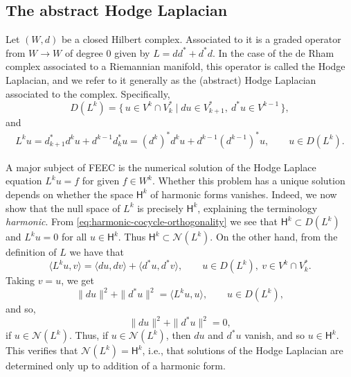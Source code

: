 \subsection{{The abstract Hodge Laplacian}}\label{sec:abstract-hodge-laplacian}

{Let $(W,d)$ be a closed Hilbert complex. Associated to it is a graded operator from $W\to W$ of degree $0$ given by $L=dd^*+d^*d$. In the case of the de Rham complex associated to a Riemannian manifold, this operator is called the Hodge Laplacian, and we refer to it generally as the (abstract) Hodge Laplacian associated to the complex. Specifically,}
\begin{equation}\label{eq:abstract-hodge-domain}
D(L^k)=\{\,u\in V^k\cap V_k^*\mid du\in V_{k+1}^*,\ d^*u\in V^{k-1}\,\},
\end{equation}
{and}
\begin{equation}\label{eq:abstract-hodge-operator}
\begin{gathered}
L^k u=d_{k+1}^*d^k u+d^{k-1}d_k^*u=(d^k)^*d^k u+d^{k-1}(d^{k-1})^*u,\qquad u\in D(L^k).
\end{gathered}
\end{equation}

{A major subject of FEEC is the numerical solution of the Hodge Laplace equation $L^k u=f$ for given $f\in W^k$. Whether this problem has a unique solution depends on whether the space $\mathsf H^k$ of harmonic forms vanishes. Indeed, we now show that the null space of $L^k$ is precisely $\mathsf H^k$, explaining the terminology \emph{harmonic}. From \eqref{eq:harmonic-cocycle-orthogonality} we see that $\mathsf H^k\subset D(L^k)$ and $L^k u=0$ for all $u\in\mathsf H^k$. Thus $\mathsf H^k\subset\mathcal N(L^k)$. On the other hand, from the definition of $L$ we have that}
\begin{equation}\label{eq:hodge-green-identity}
\langle L^k u,v\rangle=\langle du,dv\rangle+\langle d^*u,d^*v\rangle,\qquad u\in D(L^k),\ v\in V^k\cap V_k^*.
\end{equation}
{Taking $v=u$, we get}
\[
\|du\|^2+\|d^*u\|^2=\langle L^k u,u\rangle,\qquad u\in D(L^k),
\]
{and so,}
\[
\|du\|^2+\|d^*u\|^2=0,
\]
{if $u\in\mathcal N(L^k)$. Thus, if $u\in\mathcal N(L^k)$, then $du$ and $d^*u$ vanish, and so $u\in\mathsf H^k$. This verifies that $\mathcal N(L^k)=\mathsf H^k$, i.e., that solutions of the Hodge Laplacian are determined only up to addition of a harmonic form.}


